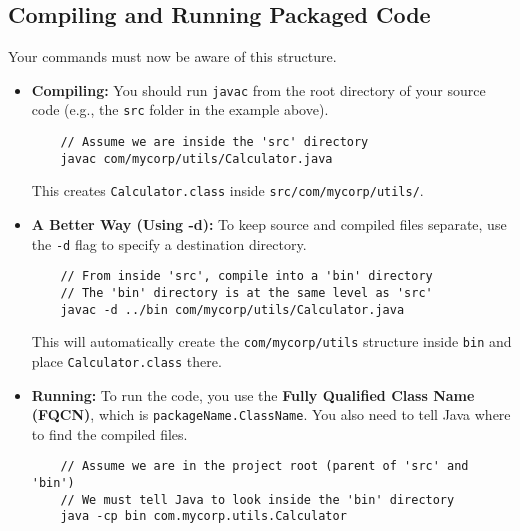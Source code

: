 \documentclass[12pt]{article}
\begin{document}
\begin{enumerate}[label=(\arabic*)]
\subsection{Compiling and Running Packaged Code}
Your commands must now be aware of this structure.
\begin{itemize}
    \item \textbf{Compiling:} You should run \texttt{javac} from the root directory of your source code (e.g., the \texttt{src} folder in the example above).
    \begin{verbatim}
    // Assume we are inside the 'src' directory
    javac com/mycorp/utils/Calculator.java
    \end{verbatim}
    This creates \texttt{Calculator.class} inside \texttt{src/com/mycorp/utils/}.

    \item \textbf{A Better Way (Using -d):} To keep source and compiled files separate, use the \texttt{-d} flag to specify a destination directory.
    \begin{verbatim}
    // From inside 'src', compile into a 'bin' directory
    // The 'bin' directory is at the same level as 'src'
    javac -d ../bin com/mycorp/utils/Calculator.java
    \end{verbatim}
    This will automatically create the \texttt{com/mycorp/utils} structure inside \texttt{bin} and place \texttt{Calculator.class} there.

    \item \textbf{Running:} To run the code, you use the \textbf{Fully Qualified Class Name (FQCN)}, which is \texttt{packageName.ClassName}. You also need to tell Java where to find the compiled files.
    \begin{verbatim}
    // Assume we are in the project root (parent of 'src' and 'bin')
    // We must tell Java to look inside the 'bin' directory
    java -cp bin com.mycorp.utils.Calculator
    \end{verbatim}
\end{itemize}


\end{enumerate}
\end{document}
